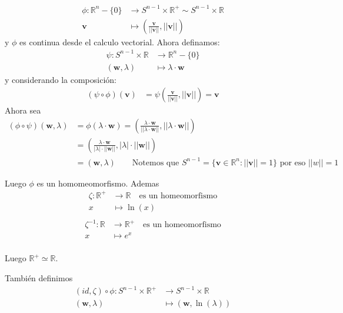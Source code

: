 \begin{align*}
\phi : \mathbb R^n - \{0\} &\to S^{n-1} \times \mathbb R^{+} \sim S^{n-1} \times \mathbb R\\
\mathbf v &\mapsto \left( \frac{\mathbf v}{||\mathbf v||}, ||\mathbf v|| \right)
\end{align*}
y $\phi$ es continua desde el calculo vectorial.
Ahora definamos:
\begin{align*}
\psi: S^{n-1} \times \mathbb R &\to \mathbb R^n - \{0\}\\
(\mathbf w, \lambda) &\mapsto \lambda \cdot \mathbf w
\end{align*}
y considerando la composición:
\begin{align*}
(\psi \circ \phi)(\mathbf v) &= \psi \left( \frac{\mathbf v}{||\mathbf v||}, ||\mathbf v|| \right)=\mathbf v
\end{align*}
Ahora sea 
\begin{align*}
(\phi \circ \psi)(\mathbf w, \lambda) &= \phi(\lambda \cdot \mathbf w) = \left( \frac{\lambda \cdot \mathbf w}{||\lambda \cdot \mathbf w||}, ||\lambda \cdot \mathbf w|| \right)\\
&= \left( \frac{\lambda \cdot \mathbf w}{|\lambda| \cdot ||\mathbf w||}, |\lambda| \cdot ||\mathbf w|| \right)\\
&= \left(\mathbf w, \lambda\right) \qquad \text{Notemos que }  S^{n-1} = \{ \mathbf v \in \mathbb R^n : ||\mathbf v|| = 1 \} \text{ por eso $||w||=1$}
\end{align*}

Luego $\phi$  es un homomeomorfismo. Ademas
\begin{align*}
\zeta: \mathbb R^+ &\to \mathbb R \quad \text{es un homeomorfismo} \\
x& \mapsto \ln(x)\\
\end{align*}
\begin{align*}
\zeta^{-1}: \mathbb R &\to \mathbb R^+ \quad \text{es un homeomorfismo} \\
x& \mapsto e^x\\ 
\end{align*}

Luego $\mathbb R^+ \simeq \mathbb R$. 

También definimos
\begin{align*}
(id, \zeta) \circ \phi : S^{n-1} \times \mathbb R^+ &\to S^{n-1} \times \mathbb R\\
(\mathbf w, \lambda) &\mapsto (\mathbf w, \ln(\lambda))\\
\end{align*}

